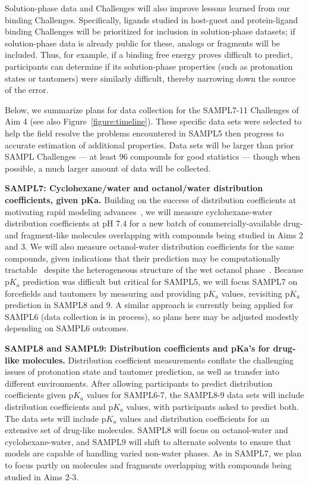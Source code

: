 \documentclass[11pt]{article}
\begin{document}
Solution-phase data and Challenges will also improve lessons learned from our binding Challenges.
Specifically, ligands studied in host-guest and protein-ligand binding Challenges will be prioritized for inclusion in solution-phase datasets; if solution-phase data is already public for these, analogs or fragments will be included. 
Thus, for example, if a binding free energy proves difficult to predict, participants can determine if its solution-phase properties (such as protonation states or tautomers) were similarly difficult, thereby narrowing down the source of the error.

Below, we summarize plans for data collection for the SAMPL7-11 Challenges of Aim 4 (see also Figure~\ref{figure:timeline}).
These specific data sets were selected to help the field resolve the problems encountered in SAMPL5 then progress to accurate estimation of additional properties.
Data sets will be larger than prior SAMPL Challenges --- at least 96 compounds for good statistics ---  though when possible, a much larger amount of data will be collected.

\textbf{SAMPL7: Cyclohexane/water and octanol/water distribution coefficients, given pKa.}
Building on the success of distribution coefficients at motivating rapid modeling advances~\cite{Bannan:2016:JComputAidedMolDes}, we will measure cyclohexane-water distribution coefficients at pH 7.4 for a new batch of commercially-available drug- and fragment-like molecules overlapping with compounds being studied in Aims 2 and 3.
We will also measure octanol-water distribution coefficients for the same compounds, given indications that their prediction may be computationally tractable~\cite{Bhatnagar:2013:PhysicalChemistryChemicalPhysics, bannan_calculating_2016} despite the heterogeneous structure of the wet octanol phase~\cite{Kollman:1996:AccountsofChemicalResearch}.
Because p$K_a$ prediction was difficult but critical for SAMPL5, we will focus SAMPL7 on forcefields and tautomers by measuring and providing p$K_a$ values, revisiting p$K_a$ prediction in SAMPL8 and 9.
A similar approach is currently being applied for SAMPL6 (data collection is in process), so plans here may be adjusted modestly depending on SAMPL6 outcomes.

\textbf{SAMPL8 and SAMPL9: Distribution coefficients and pKa's for drug-like molecules.} 
Distribution coefficient measurements conflate the challenging issues of protonation state and tautomer prediction, as well as transfer into different environments. 
After allowing participants to predict distribution coefficients given p$K_a$ values for SAMPL6-7, the SAMPL8-9 data sets will include distribution coefficients and p$K_a$ values, with participants asked to predict both. 
The data sets will include p$K_a$ values and distribution coefficients for an extensive set of drug-like molecules.
SAMPL8 will focus on octanol-water and cyclohexane-water, and SAMPL9 will shift to alternate solvents to ensure that models are capable of handling varied non-water phases. 
As in SAMPL7, we plan to focus partly on molecules and fragments overlapping with compounds being studied in Aims 2-3.
\end{document}
